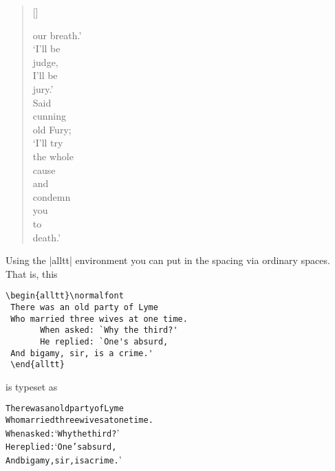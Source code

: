 \begin{verse}[\versewidth]
\begin{patverse}
   our breath.' \\
 \tiny  `I'll be \\
   judge, \\
   I'll be \\
   jury.' \\
   Said \\
   cunning \\
   old Fury; \\
   `I'll try \\
   the whole \\
   cause \\
   and \\
   condemn \\
   you \\
   to \\
   death.'  \par
 \end{patverse}
 \end{verse}
 
\clearpage


 Using the |alltt| environment you can put in the spacing via ordinary
 spaces. That is, this

\begin{lstlisting}[language={[common]TeX},% 
                           alsolanguage={[LaTeX]TeX},% 
                           alsolanguage={[primitive]TeX},%
                           alsolanguage={Verse}]
 \begin{alltt}\normalfont
 There was an old party of Lyme
 Who married three wives at one time.
       When asked: `Why the third?' 
       He replied: `One's absurd, 
 And bigamy, sir, is a crime.'
 \end{alltt}
 \end{lstlisting}

 is typeset as

 \begin{alltt}
 \normalfont
 There was an old party of Lyme
 Who married three wives at one time.
       When asked: `Why the third?' 
       He replied: `One's absurd, 
 And bigamy, sir, is a crime.'
 \end{alltt}










